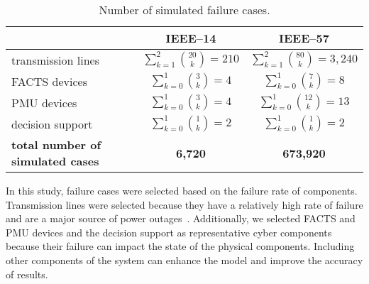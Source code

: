 \documentclass[12pt]{elsarticle}
\begin{document}
\begin{table}[!t]
\caption{Number of simulated failure cases.}
\label{tab:failure_cases}
\footnotesize
\centering
\renewcommand{\arraystretch}{1.3}
\begin{tabular}{m{}|c|c}
  & IEEE--14 & IEEE--57 \\ \hline
  transmission lines & $\sum\limits_{k=1}^2\binom{20}{k} = 210$ & $\sum\limits_{k=1}^2\binom{80}{k} = 3,240$ \\
  FACTS devices & $\sum\limits_{k=0}^1\binom{3}{k} = 4$ & $\sum\limits_{k=0}^1\binom{7}{k} = 8$ \\
  PMU devices & $\sum\limits_{k=0}^1\binom{3}{k} = 4$ & $\sum\limits_{k=0}^1\binom{12}{k} = 13$ \\
  decision support & $\sum\limits_{k=0}^1\binom{1}{k} = 2$ & $\sum\limits_{k=0}^1\binom{1}{k} = 2$ \\ \hline
  \textbf{total number of simulated cases} & \textbf{6,720} & \textbf{673,920}
\end{tabular}
\end{table}

In this study, failure cases were selected based on the failure rate of components. Transmission lines were selected because they have a relatively high rate of failure and are a major source of power outages~\cite{SoW13}. Additionally, we selected FACTS and PMU devices and the decision support as representative cyber components because their failure can impact the state of the physical components. Including other components of the system can enhance the model and improve the accuracy of results.
\end{document}
